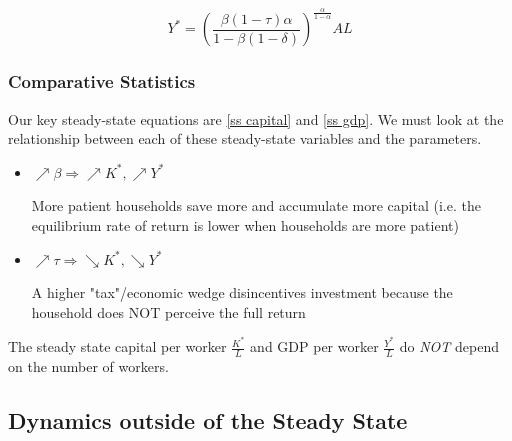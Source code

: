 \documentclass[11pt]{article}
\begin{document}
\begin{mdframed}
    \begin{equation}
        \label{ss gdp}
        Y^* =\left(\frac{\beta(1-\tau) \alpha}{1-\beta(1-\delta)}\right)^{\frac{\alpha}{1-\alpha}} A L 
    \end{equation}
\end{mdframed}

\subsubsection{Comparative Statistics}

Our key steady-state equations are \eqref{ss capital} and \eqref{ss gdp}. We must look at the relationship between each of these steady-state variables and the parameters.

\begin{itemize}
    \item $\nearrow \beta \Rightarrow \nearrow K^*, \nearrow Y^*$

    \begin{intu}
        More patient households save more and accumulate more capital (i.e. the equilibrium rate of return is lower when households are more patient)
    \end{intu}
    \item $\nearrow \tau \Rightarrow \searrow K^*, \searrow Y^*$

    \begin{intu}
        A higher "tax"/economic wedge disincentives investment because the household does NOT perceive the full return
    \end{intu}
\end{itemize}

\begin{note}
    The steady state capital per worker $\frac{K^*}{L}$ and GDP per worker $\frac{Y^*}{L}$ do \textit{NOT} depend on the number of workers.
\end{note}

\subsection{Dynamics outside of the Steady State}
\end{document}
